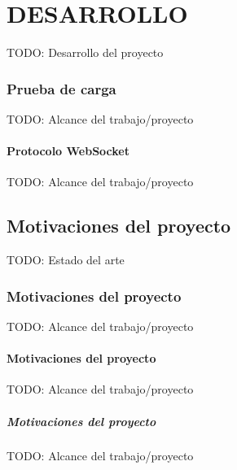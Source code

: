 \chapter{DESARROLLO\label{sec:desarrollo}}

TODO: Desarrollo del proyecto

\subsection{Prueba de carga}

TODO: Alcance del trabajo/proyecto

\subsubsection{Protocolo WebSocket}

TODO: Alcance del trabajo/proyecto

\section{Motivaciones del proyecto}

TODO: Estado del arte

\subsection{Motivaciones del proyecto}

TODO: Alcance del trabajo/proyecto

\subsubsection{Motivaciones del proyecto}

TODO: Alcance del trabajo/proyecto

\paragraph{Motivaciones del proyecto}

TODO: Alcance del trabajo/proyecto
